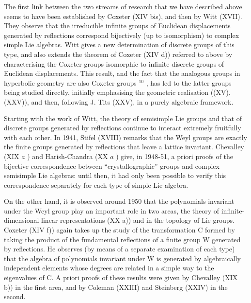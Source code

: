 The first link between the two streams of research that we have described above seems to have been established by Coxeter (XIV bis), and then by Witt (XVII). They observe that the irreducible infinite groups of Euclidean displacements generated by reflections correspond bijectively (up to isomorphism) to complex simple Lie algebras. Witt gives a new determination of discrete groups of this type, and also extends the theorem of Coxeter (XIV d)) referred to above by characterising the Coxeter groups isomorphic to infinite discrete groups of Euclidean displacements. This result, and the fact that the analogous groups in hyperbolic geometry are also Coxeter groups \(^{10}\) , has led to the latter groups being studied directly, initially emphasising the geometric realisation ((XV), (XXV)), and then, following J. Tits (XXV), in a purely algebraic framework.

Starting with the work of Witt, the theory of semisimple Lie groups and that of discrete groups generated by reflections continue to interact extremely fruitfully with each other. In 1941, Stifel (XVIII) remarks that the Weyl groups are exactly the finite groups generated by reflections that leave a lattice invariant. Chevalley (XIX \(a\) ) and Harish-Chandra (XX \(a\) ) give, in 1948-51, a priori proofs of the bijective correspondence between ``crystallographic'' groups and complex semisimple Lie algebras: until then, it had only been possible to verify this correspondence separately for each type of simple Lie algebra.

On the other hand, it is observed around 1950 that the polynomials invariant under the Weyl group play an important role in two areas, the theory of infinite-dimensional linear representations (XX a)) and in the topology of Lie groups. Coxeter (XIV f)) again takes up the study of the transformation C formed by taking the product of the fundamental reflections of a finite group W generated by reflections. He observes (by means of a separate examination of each type) that the algebra of polynomials invariant under W is generated by algebraically independent elements whose degrees are related in a simple way to the eigenvalues of C. A priori proofs of these results were given by Chevalley (XIX b)) in the first area, and by Coleman (XXIII) and Steinberg (XXIV) in the second.

